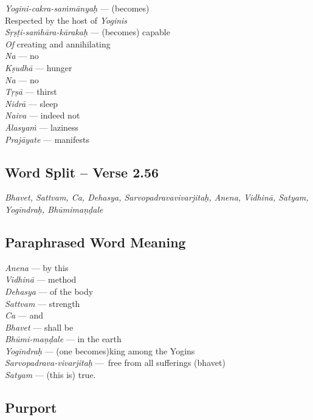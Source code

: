 \begin{multicols}{2}
\textit{Yogini-cakra-saṁmānyaḥ} --- (becomes)\\
Respected by the host of \textit{Yoginis} \\
\textit{Sṛṣṭi-saṁhāra-kārakaḥ} --- (becomes) capable\\
\textit{Of} creating and annihilating  \\
\textit{Na} --- no \\
\textit{Kṣudhā} --- hunger \\
\textit{Na} --- no\\
\textit{Tṛṣā} --- thirst \\
\textit{Nidrā} --- sleep \\
\textit{Naiva} --- indeed not \\
\textit{Ālasyaṁ} --- laziness \\
\textit{Prajāyate} --- manifests 
\end{multicols}

\subsection*{Word Split -- Verse 2.56}


\textit{Bhavet, Sattvam, Ca, Dehasya, Sarvopadravavivarjitaḥ, Anena, Vidhinā, Satyam, Yogīndraḥ, Bhūmimaṇḍale}

\subsection*{Paraphrased Word Meaning}


\begin{multicols}{2}
\textit{Anena} --- by this\\
\textit{Vidhinā} --- method\\ 
\textit{Dehasya} --- of the body \\
\textit{Sattvam} --- strength \\
\textit{Ca} --- and \\
\textit{Bhavet} --- shall be \\
\textit{Bhūmi-maṇḍale} --- in the earth \\
\textit{Yogīndraḥ} --- (one becomes)king among the Yogins\\
\textit{Sarvopadrava-vivarjitaḥ} --- free from all sufferings (bhavet) \\
\textit{Satyam} --- (this is) true.
\end{multicols}

\subsection*{Purport}
\vspace{-5pt}

